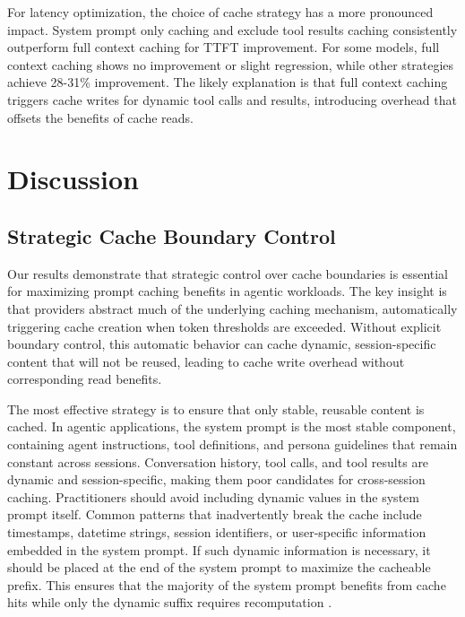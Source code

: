 \documentclass{article}
\theoremstyle{plain}
\theoremstyle{definition}
\theoremstyle{remark}
\begin{document}
For latency optimization, the choice of cache strategy has a more pronounced impact. System prompt only caching and exclude tool results caching consistently outperform full context caching for TTFT improvement. For some models, full context caching shows no improvement or slight regression, while other strategies achieve 28-31\% improvement. The likely explanation is that full context caching triggers cache writes for dynamic tool calls and results, introducing overhead that offsets the benefits of cache reads.



\section{Discussion}
\label{sec:discussion}

\subsection{Strategic Cache Boundary Control}
\label{subsec:cache_boundaries}

Our results demonstrate that strategic control over cache boundaries is essential for maximizing prompt caching benefits in agentic workloads. The key insight is that providers abstract much of the underlying caching mechanism, automatically triggering cache creation when token thresholds are exceeded. Without explicit boundary control, this automatic behavior can cache dynamic, session-specific content that will not be reused, leading to cache write overhead without corresponding read benefits.

The most effective strategy is to ensure that only stable, reusable content is cached. In agentic applications, the system prompt is the most stable component, containing agent instructions, tool definitions, and persona guidelines that remain constant across sessions. Conversation history, tool calls, and tool results are dynamic and session-specific, making them poor candidates for cross-session caching. Practitioners should avoid including dynamic values in the system prompt itself. Common patterns that inadvertently break the cache include timestamps, datetime strings, session identifiers, or user-specific information embedded in the system prompt. If such dynamic information is necessary, it should be placed at the end of the system prompt to maximize the cacheable prefix. This ensures that the majority of the system prompt benefits from cache hits while only the dynamic suffix requires recomputation \cite{ji2025manus_context_engineering}.
\end{document}

